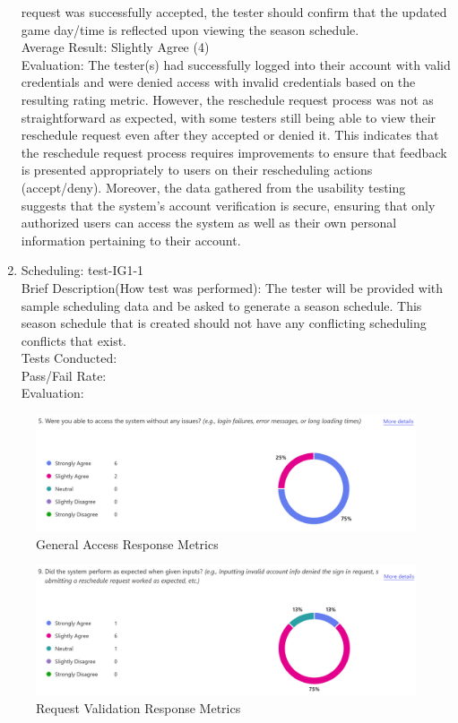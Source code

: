 \documentclass[12pt, titlepage]{article}
\begin{document}
\begin{enumerate}
  request was successfully accepted, the tester should confirm that the updated game day/time
  is reflected upon viewing the season schedule. \\
  Average Result: Slightly Agree (4)\\
  Evaluation: The tester(s) had successfully logged into their account with valid credentials
  and were denied access with invalid credentials based on the resulting rating metric. However,
  the reschedule request process was not as straightforward as expected, with some testers
  still being able to view their reschedule request even after they accepted or denied it.
  This indicates that the reschedule request process requires improvements to ensure that feedback
  is presented appropriately to users on their rescheduling actions (accept/deny). Moreover, the
  data gathered from the usability testing suggests that the system's account verification is
  secure, ensuring that only authorized users can access the system as well as their own personal
  information pertaining to their account.
  \item{Scheduling: test-IG1-1\\}
  Brief Description(How test was performed): The tester will be provided with sample
  scheduling data and be asked to generate a season schedule. This season schedule that is created
  should not have any conflicting scheduling conflicts that exist. \\
  Tests Conducted: \\
  Pass/Fail Rate: \\
  Evaluation: 
\end{enumerate}

\begin{figure}[H]
\centering
\includegraphics[scale=0.6]{survey_responses_access.png}
\caption{General Access Response Metrics}
\label{access}
\end{figure}

\begin{figure}[H]
\centering
\includegraphics[scale=0.6]{survey_responses_validate_inputs.png}
\caption{Request Validation Response Metrics}
\label{validate}
\end{figure}
	
\end{document}
